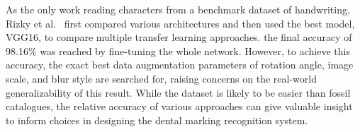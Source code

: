 \documentclass[english,twoside,openright]{UH_DS_MSc}
\begin{document}




As the only work reading characters from a benchmark dataset of handwriting, Rizky et al.~\cite{7rizkybasicCnnTransfer}
first compared various architectures and then used the best model, VGG16, to compare multiple transfer learning 
approaches. the final accuracy of 98.16\% was reached by fine-tuning the whole network. However, to achieve this accuracy, the exact best data augmentation parameters of 
rotation angle, image scale, and blur style are searched for, raising concerns on the real-world generalizability of this result.
 While the dataset is likely to be easier than fossil catalogues, the relative accuracy of
various approaches can give valuable insight to inform choices in designing the dental marking recognition system.


\end{document}
